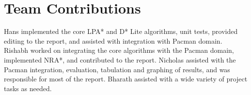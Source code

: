\section{Team Contributions}
Hans implemented the core LPA* and D* Lite algorithms, unit tests, provided editing to the report, and assisted with integration with Pacman domain. Rishabh worked on integrating the core algorithms with the Pacman domain, implemented NRA*, and contributed to the report. Nicholas assisted with the Pacman integration, evaluation, tabulation and graphing of results, and was responsible for most of the report. Bharath assisted with a wide variety of project tasks as needed.